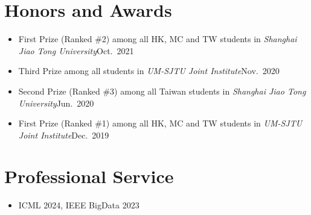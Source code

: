 \documentclass[letterpaper,10.8pt]{article}
\begin{document}
\section{Honors and Awards}
\begin{itemize}
      \item {}
            {First Prize (Ranked \#2) among all HK, MC and TW students in \emph{Shanghai Jiao Tong University}}{Oct.\ 2021}

      \item {}
            {Third Prize among all students in \emph{UM-SJTU Joint Institute}}{Nov.\ 2020}

      \item {}
            {Second Prize (Ranked \#3) among all Taiwan students in \emph{Shanghai Jiao Tong University}}{Jun.\ 2020}

      \item {}
            {First Prize (Ranked \#1) among all HK, MC and TW students in \emph{UM-SJTU Joint Institute}}{Dec.\ 2019}
\end{itemize}

\section{Professional Service}
\begin{itemize}
      \item {}
            {ICML 2024, IEEE BigData 2023}{}
\end{itemize}
\end{document}
